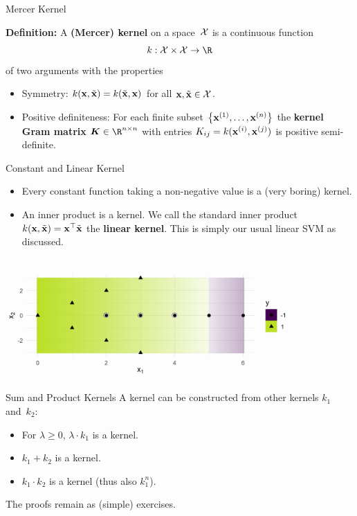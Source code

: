 \documentclass[11pt,compress,t,notes=noshow, xcolor=table]{beamer}
\begin{document}
\begin{vbframe}{Mercer Kernel}


  \textbf{Definition:} A \textbf{(Mercer) kernel} on a space~$\mathcal{X}$ is a
  continuous function
  $$ k : \Xspace \times \Xspace \to \R $$
  of two arguments with the properties
  \begin{itemize}
    \item Symmetry: $k(\mathbf{x}, \tilde {\mathbf{x}}) = k(\tilde {\mathbf{x}}, \mathbf{x})$ for all
    $\mathbf{x}, \tilde {\mathbf{x}} \in \mathcal{X}$.
    \item Positive definiteness: For each finite subset $\left\{\mathbf{x}^{(1)}, \dots, \mathbf{x}^{(n)}\right\}$
    the \textbf{kernel Gram matrix} $\bm{K} \in \R^{n \times n}$ with entries
    $K_{ij} = k(\mathbf{x}^{(i)}, \mathbf{x}^{(j)})$ is positive semi-definite.
  \end{itemize}

\end{vbframe}

\begin{vbframe}{Constant and Linear Kernel}

  \begin{itemize}
    \item Every constant function taking a non-negative value is a
    (very boring) kernel.
    \item An inner product is a kernel.
    We call the standard inner product $k(\mathbf{x}, \tilde {\mathbf{x}}) = \mathbf{x}^\top \tilde {\mathbf{x}}$
    the \textbf{linear kernel}. This is simply our usual linear SVM as discussed.
  \end{itemize}
  

\begin{center}
\includegraphics[width = 11cm ]{figure/svm_linear_kernel.png}
\end{center}

\end{vbframe}

\begin{vbframe}{Sum and Product Kernels}
    A kernel can be constructed from other kernels $k_1$ and~$k_2$:
  \begin{itemize}
      \item For $\lambda \geq 0$, $\lambda \cdot k_1$ is a kernel.
      \item $k_1 + k_2$ is a kernel.
      \item $k_1 \cdot k_2$ is a kernel (thus also $k_1^n$).
    \end{itemize}
    
    \lz

    The proofs remain as (simple) exercises.
\end{vbframe}
\end{document}
